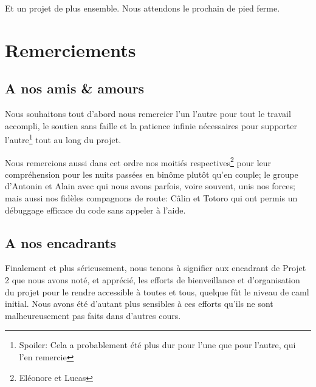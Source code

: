 \documentclass{article}
\begin{document}
	Et un projet de plus ensemble. Nous attendons le prochain de pied ferme.
	
\section{Remerciements}
\subsection{A nos amis \& amours}
Nous souhaitons tout d'abord nous remercier l'un l'autre pour tout le travail accompli, le soutien sans faille et la patience infinie nécessaires pour supporter l'autre\footnote{Spoiler: Cela a probablement été plus dur pour l'une que pour l'autre, qui l'en remercie} tout au long du projet. 

Nous remercions aussi dans cet ordre nos moitiés respectives\footnote{Eléonore et Lucas} pour leur compréhension pour les nuits passées en binôme plutôt qu'en couple; le groupe d'Antonin et Alain avec qui nous avons parfois, voire souvent, unis nos forces; mais aussi nos fidèles compagnons de route: Câlin et Totoro qui ont permis un débuggage efficace du code sans appeler à l'aide.
\subsection{A nos encadrants}
Finalement et plus sérieusement, nous tenons à signifier aux encadrant de Projet 2 que nous avons noté, et apprécié, les efforts de bienveillance et d'organisation du projet pour le rendre accessible à toutes et tous, quelque fût le niveau de caml initial. Nous avons été d'autant plus sensibles à ces efforts qu'ils ne sont malheureusement pas faits dans d'autres cours.




\end{document}

